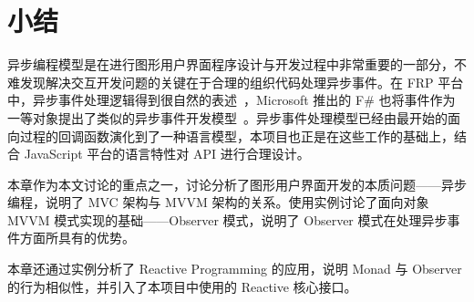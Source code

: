 \section{小结}

异步编程模型是在进行图形用户界面程序设计与开发过程中非常重要的一部分，不难发现解决交互开发问题的关键在于合理的组织代码处理异步事件。在 FRP 平台中，异步事件处理逻辑得到很自然的表述~\cite{Wan:2002:EF:645772.667941}，Microsoft 推出的 F\# 也将事件作为一等对象提出了类似的异步事件开发模型~\cite{Syme:2011:FAP:1946313.1946334}。异步事件处理模型已经由最开始的面向过程的回调函数演化到了一种语言模型，本项目也正是在这些工作的基础上，结合 JavaScript 平台的语言特性对 API 进行合理设计。

本章作为本文讨论的重点之一，讨论分析了图形用户界面开发的本质问题——异步编程，说明了 MVC 架构与 MVVM 架构的关系。使用实例讨论了面向对象 MVVM 模式实现的基础——Observer 模式，说明了 Observer 模式在处理异步事件方面所具有的优势。

本章还通过实例分析了 Reactive Programming 的应用，说明 Monad 与 Observer 的行为相似性，并引入了本项目中使用的 Reactive 核心接口。

